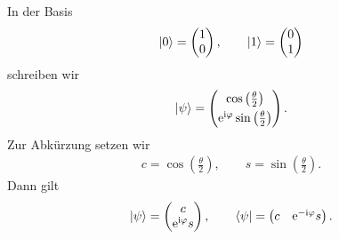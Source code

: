 \documentclass[11pt,a4paper]{scrartcl}
\newcommand{\e}{\mathrm e}
\newcommand{\ii}{\mathrm i}
\begin{document}
\begin{enumerate}[label=(\alph*)]
\begin{calculationbox}
            \begin{calculationbox}[title=Darstellung des Zustands als Spaltenvektor]
                In der Basis
                \begin{align*}
                    \ket{0}=
                    \begin{pmatrix}
                        1\\0
                    \end{pmatrix},
                    \qquad
                    \ket{1}=
                    \begin{pmatrix}
                        0\\1
                    \end{pmatrix}
                \end{align*}
                schreiben wir
                \begin{align*}
                    \ket{\psi}
                    =
                    \begin{pmatrix}
                        \cos\left(\frac{\theta}{2}\right)\\[0.3em]
                        \e^{\ii\varphi}\sin\left(\frac{\theta}{2}\right)
                    \end{pmatrix}.
                \end{align*}
                Zur Abkürzung setzen wir
                \begin{align*}
                    c=\cos\left(\frac{\theta}{2}\right),
                    \qquad
                    s=\sin\left(\frac{\theta}{2}\right).
                \end{align*}
                Dann gilt
                \begin{align*}
                    \ket{\psi}
                    =
                    \begin{pmatrix}
                        c\\
                        \e^{\ii\varphi}s
                    \end{pmatrix},
                    \qquad
                    \bra{\psi}
                    =
                    \begin{pmatrix}
                        c & \e^{-\ii\varphi}s
                    \end{pmatrix}.
                \end{align*}
            \end{calculationbox}


\end{calculationbox}
\end{enumerate}
\end{document}
